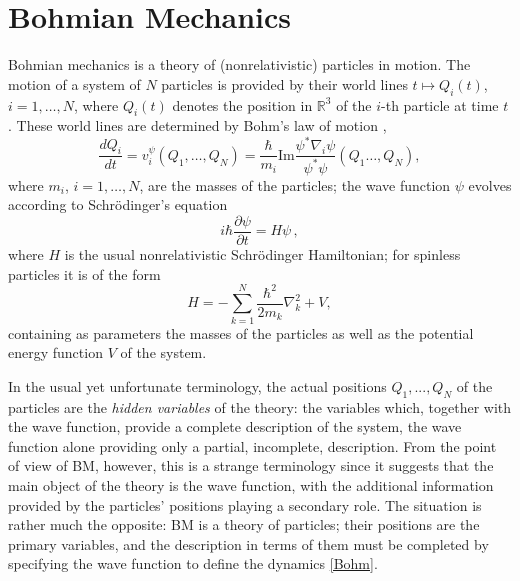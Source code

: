 \documentclass[12pt]{article}
\renewcommand{\Im}{\mathrm{Im}}
\newcommand{\RRR}{\mathbb{R}}
\begin{document}
\section{Bohmian Mechanics}
\label{sec:bm}

Bohmian mechanics is a theory of (nonrelativistic) particles in motion. The motion of a system of $N$ particles is provided by their world lines $t \mapsto Q_i(t)$, $i=1, \ldots, N$, where $Q_i(t)$ denotes the position in $\RRR^3$ of the $i$-th particle at time $t$. These world lines are determined by Bohm's law of motion \citep{Bohm52, Bell66, DGZ92, survey}, 
\begin{equation}\label{Bohm}
  \frac{dQ_i}{dt}=v_i^{\psi}(Q_1, \ldots, Q_N)=\frac{\hbar}{m_i}
  \Im \frac{\psi^{*}\nabla_i \psi}{\psi^{*}\psi}(Q_1\ldots,Q_N), 
\end{equation}
where $m_i$, $i=1, \ldots, N$,  are the masses of the particles;
the wave function $\psi$ evolves according to Schr\"odinger's equation
\begin{equation}\label{Schr}
 i\hbar\frac{\partial \psi}{\partial t} = H\psi \,,
\end{equation} 
where
 $H$ is the usual nonrelativistic Schr\"odinger Hamiltonian; for
spinless particles it is of the form
\begin{equation}
\label{eq:H}
H=-\sum_{k=1}^N\frac{\hbar^2}{2m_k}\nabla^2_k+V,
\end{equation}
containing as parameters the masses  of the particles as
well as the potential energy function $V$ of the system. 

In the usual yet unfortunate terminology, the actual positions $Q_1, ..., Q_N $ of the particles are the \emph{hidden variables} of the theory: the variables which, together with the wave function, provide a complete description of the system, the wave function alone providing only a partial, incomplete, description.
From the point of view of {\sf BM}, however, this is a strange terminology since it suggests that the main object of the theory is the wave function, with the additional information provided by the particles' positions playing a secondary role. The situation is rather much the opposite: {\sf BM} is a theory of particles; their positions are the primary variables, and the description in terms of them must be completed by specifying the wave function to define the dynamics \eqref{Bohm}. 
\end{document}
